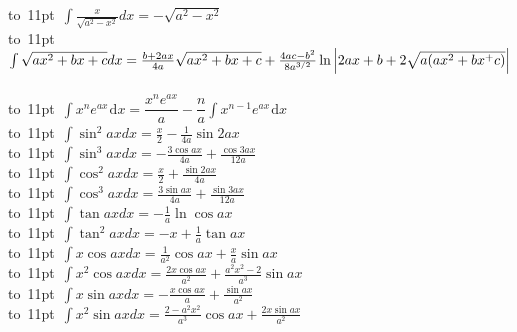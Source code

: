 \begin{footnotesize}
\mbox{\vbox to 11pt{  \hbox{$
\int \frac{x}{\sqrt{a^2-x^2}}dx = -\sqrt{a^2-x^2} 
$}  }}
\\
\mbox{\vbox to 11pt{  \hbox{$
\int  \sqrt{a x^2 + b x + c} dx = 
\frac{b+2ax}{4a}\sqrt{ax^2+bx+c}
\nonumber \\  
+
\frac{4ac-b^2}{8a^{3/2}}\ln \left| 2ax + b + 2\sqrt{a(ax^2+bx^+c)}\right |
$}  }}
\\
\mbox{\vbox to 11pt{  \hbox{$
\int x^n e^{ax}\hspace{1pt}\text{d}x = \dfrac{x^n e^{ax}}{a} - 
\dfrac{n}{a}\int x^{n-1}e^{ax}\hspace{1pt}\text{d}x
$}  }} 
\\
\mbox{\vbox to 11pt{  \hbox{$
\int \sin^2 ax dx = \frac{x}{2} - \frac{1} {4a} \sin{2ax}
$}  }}
\\
\mbox{\vbox to 11pt{  \hbox{$
\int \sin^3 ax dx = -\frac{3 \cos ax}{4a} + \frac{\cos 3ax} {12a} 
$}  }}
\\
\mbox{\vbox to 11pt{  \hbox{$
\int \cos^2 ax dx = \frac{x}{2}+\frac{ \sin 2ax}{4a} 
$}  }}
\\
\mbox{\vbox to 11pt{  \hbox{$
\int \cos^3 ax dx = \frac{3 \sin ax}{4a}+\frac{ \sin 3ax}{12a} 
$}  }}
\\
\mbox{\vbox to 11pt{  \hbox{$
\int \tan ax dx = -\frac{1}{a} \ln \cos ax 
$}  }}
\\
\mbox{\vbox to 11pt{  \hbox{$
\int \tan^2 ax dx = -x + \frac{1}{a} \tan ax 
$}  }}
\\
\mbox{\vbox to 11pt{  \hbox{$
\int x \cos ax dx = \frac{1}{a^2} \cos ax + \frac{x}{a} \sin ax 
$}  }}
\\
\mbox{\vbox to 11pt{  \hbox{$
\int x^2 \cos ax dx = \frac{2 x \cos ax }{a^2} + \frac{ a^2 x^2 - 2  }{a^3} \sin ax 
$}  }}
\\
\mbox{\vbox to 11pt{  \hbox{$
\int x \sin ax dx = -\frac{x \cos ax}{a} + \frac{\sin ax}{a^2} 
$}  }}
\\
\mbox{\vbox to 11pt{  \hbox{$
\int x^2 \sin ax dx =\frac{2-a^2x^2}{a^3}\cos ax +\frac{ 2 x \sin ax}{a^2} 
$}  }}
\end{footnotesize}
